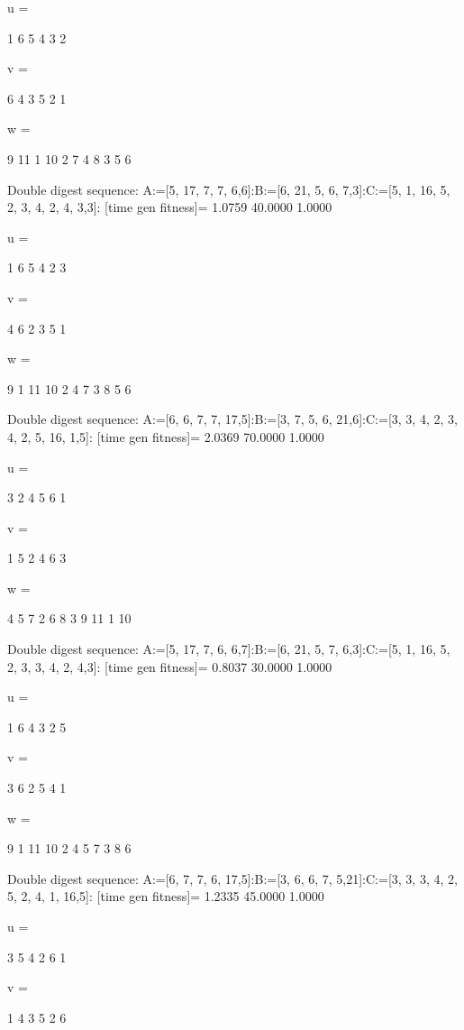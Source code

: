 u =

     1     6     5     4     3     2


v =

     6     4     3     5     2     1


w =

     9    11     1    10     2     7     4     8     3     5     6

Double digest sequence:
A:=[5, 17, 7, 7, 6,6]:B:=[6, 21, 5, 6, 7,3]:C:=[5, 1, 16, 5, 2, 3, 4, 2, 4, 3,3]:
[time gen fitness]=
    1.0759   40.0000    1.0000


u =

     1     6     5     4     2     3


v =

     4     6     2     3     5     1


w =

     9     1    11    10     2     4     7     3     8     5     6

Double digest sequence:
A:=[6, 6, 7, 7, 17,5]:B:=[3, 7, 5, 6, 21,6]:C:=[3, 3, 4, 2, 3, 4, 2, 5, 16, 1,5]:
[time gen fitness]=
    2.0369   70.0000    1.0000


u =

     3     2     4     5     6     1


v =

     1     5     2     4     6     3


w =

     4     5     7     2     6     8     3     9    11     1    10

Double digest sequence:
A:=[5, 17, 7, 6, 6,7]:B:=[6, 21, 5, 7, 6,3]:C:=[5, 1, 16, 5, 2, 3, 3, 4, 2, 4,3]:
[time gen fitness]=
    0.8037   30.0000    1.0000


u =

     1     6     4     3     2     5


v =

     3     6     2     5     4     1


w =

     9     1    11    10     2     4     5     7     3     8     6

Double digest sequence:
A:=[6, 7, 7, 6, 17,5]:B:=[3, 6, 6, 7, 5,21]:C:=[3, 3, 3, 4, 2, 5, 2, 4, 1, 16,5]:
[time gen fitness]=
    1.2335   45.0000    1.0000


u =

     3     5     4     2     6     1


v =

     1     4     3     5     2     6


